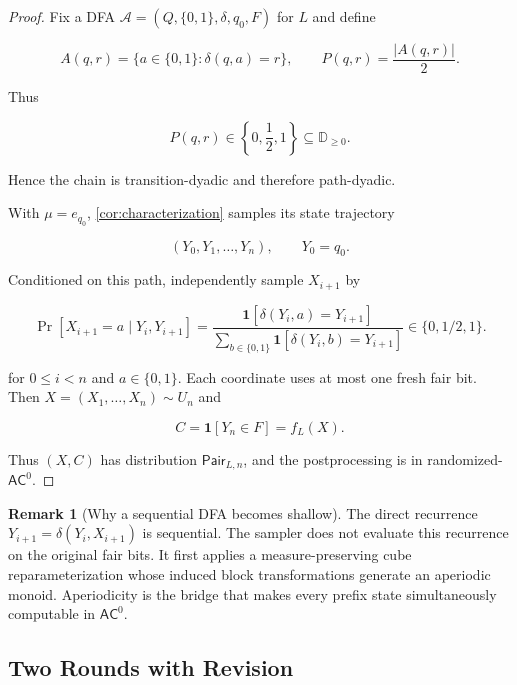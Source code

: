 \documentclass[10pt]{article}
\theoremstyle{definition}
\newtheorem{remark}[theorem]{Remark}
\newcommand{\AC}{\mathsf{AC}}
\newcommand{\Pair}{\mathsf{Pair}}
\newcommand{\bits}{\{0,1\}}
\newcommand{\ind}{\mathbf{1}}
\begin{document}
\begin{proof}
Fix a DFA $\mathcal A=(Q,\bits,\delta,q_0,F)$ for $L$ and define

\begin{equation}
 A(q,r)=\{a\in\bits:\delta(q,a)=r\},\qquad
 P(q,r)=\frac{|A(q,r)|}{2}.
 \label{eq:dfa-chain}
\end{equation}

Thus

\begin{equation}
 P(q,r)\in\left\{0,\frac12,1\right\}
 \subseteq\mathbb D_{\ge0}.
\end{equation}

Hence the chain is transition-dyadic and therefore path-dyadic.

With $\mu=e_{q_0}$, \cref{cor:characterization} samples its state trajectory

\begin{equation}
 (Y_0,Y_1,\ldots,Y_n),\qquad Y_0=q_0.
\end{equation}

Conditioned on this path, independently sample $X_{i+1}$ by

\begin{equation}
 \Pr[X_{i+1}=a\mid Y_i,Y_{i+1}]
 =\frac{\ind[\delta(Y_i,a)=Y_{i+1}]}
 {\sum_{b\in\bits}\ind[\delta(Y_i,b)=Y_{i+1}]}
 \in\{0,1/2,1\}.
 \label{eq:posterior-letter}
\end{equation}

for $0\le i<n$ and $a\in\bits$.  Each coordinate uses at most one fresh fair
bit.  Then $X=(X_1,\ldots,X_n)\sim U_n$ and

\begin{equation}
 C=\ind[Y_n\in F]=f_L(X).
\end{equation}

Thus $(X,C)$ has distribution $\Pair_{L,n}$, and the postprocessing is in
randomized-$\AC^0$.
\end{proof}

\begin{remark}[Why a sequential DFA becomes shallow]
The direct recurrence $Y_{i+1}=\delta(Y_i,X_{i+1})$ is sequential.  The
sampler does not evaluate this recurrence on the original fair bits.  It first
applies a measure-preserving cube reparameterization whose induced block
transformations generate an aperiodic monoid.  Aperiodicity is the bridge that
makes every prefix state simultaneously computable in $\AC^0$.
\end{remark}

\subsection{Two Rounds with Revision}
\label{sec:dlm}
\end{document}
